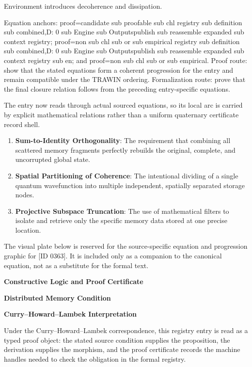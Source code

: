 Environment introduces decoherence and dissipation.

Equation anchors: proof=candidate sub proofable sub chl registry sub definition sub combined,D: 0 sub Engine sub Outputspublish sub reassemble expanded sub context registry; proof=non sub chl sub or sub empirical registry sub definition sub combined,D: 0 sub Engine sub Outputspublish sub reassemble expanded sub context registry sub en; and proof=non sub chl sub or sub empirical. Proof route: show that the stated equations form a coherent progression for the entry and remain compatible under the TRAWIN ordering. Formalization route: prove that the final closure relation follows from the preceding entry-specific equations.

The entry now reads through actual sourced equations, so its local arc is carried by explicit mathematical relations rather than a uniform quaternary certificate record shell.
\endgroup

\begin{enumerate}[leftmargin=1.6em,itemsep=6pt,topsep=4pt]
\item \textbf{Sum-to-Identity Orthogonality}: The requirement that combining all scattered memory fragments perfectly rebuilds the original, complete, and uncorrupted global state.
\item \textbf{Spatial Partitioning of Coherence}: The intentional dividing of a single quantum wavefunction into multiple independent, spatially separated storage nodes.
\item \textbf{Projective Subspace Truncation}: The use of mathematical filters to isolate and retrieve only the specific memory data stored at one precise location.
\end{enumerate}

\begingroup\footnotesize\sloppy
The visual plate below is reserved for the source-specific equation and progression graphic for [ID 0363]. It is included only as a companion to the canonical equation, not as a substitute for the formal text.
\par\endgroup
\ifTZPDarkEdition
{}
\fi

\clearpage
\begingroup\tzpsupportsetup
\noindent\textbf{\fontsize{10.8pt}{12.8pt}\selectfont [ID 0363] Constructive Logic and Proof Certificate}\par
\noindent\textbf{\fontsize{10pt}{12pt}\selectfont Distributed Memory Condition}\par
\vspace{0.45em}
\begingroup
\footnotesize
\setlength{\parskip}{0.22em}
\setlength{\parindent}{0pt}
\noindent\textbf{Curry--Howard--Lambek Interpretation}\par
Under the Curry--Howard--Lambek correspondence, this registry entry is read as a typed proof
object: the stated source condition supplies the proposition, the derivation supplies the
morphism, and the proof certificate records the machine handles needed to check the obligation
in the formal registry.

